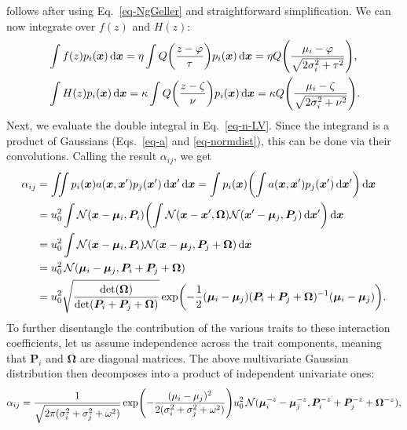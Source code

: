 \documentclass{article}
\newcommand{\mat}[1]{\bm{#1}}
\newcommand{\ud}{\text{d}}
\let\originalleft\left
\let\originalright\right
\renewcommand{\left}{\mathopen{}\mathclose\bgroup\originalleft}
\renewcommand{\right}{\aftergroup\egroup\originalright}
\begin{document}
follows after using Eq.~\ref{eq-NgGeller} and straightforward simplification. We can now integrate over $f(z)$ and $H(z)$:
\begin{align}
  \label{eq-fN}
  &\int f(z) p_i(\mat{x}) \,\ud\mat{x}
  = \eta \int Q\left( \frac{z-\varphi}{\tau} \right)
  p_i(\mat{x}) \,\ud\mat{x}
  = \eta Q\left(\frac{\mu_i-\varphi}
  {\sqrt{2\sigma_i^2+\tau^2}}\right), \\
  \label{eq-HN}
  &\int H(z) p_i(\mat{x}) \,\ud\mat{x}
  = \kappa \int Q\left( \frac{z-\zeta}{\nu} \right)
  p_i(\mat{x}) \,\ud\mat{x}
  = \kappa Q \left(\frac{\mu_i-\zeta}
  {\sqrt{2\sigma_i^2+\nu^2}}\right) .
\end{align}
Next, we evaluate the double integral in Eq.~\ref{eq-n-LV}. Since the integrand is a product of Gaussians (Eqs.~\ref{eq-a} and \ref{eq-normdist}), this can be done via their convolutions. Calling the result $\alpha_{ij}$, we get
\begin{equation}
  \label{eq-alphaN-calc}
  \begin{split}
    \alpha_{ij}
    &= \iint p_i(\mat{x}) a(\mat{x},\mat{x}')
    p_j(\mat{x}') \,\ud \mat{x}' \,\ud \mat{x}
    = \int p_i(\mat{x}) \left( \int a(\mat{x}, \mat{x}')
    p_j(\mat{x}') \,\ud \mat{x}' \right) \,\ud \mat{x}
    \\ &= u_0^2 \int \mathcal{N}(\mat{x} - \mat{\mu}_i, \mat{P}_i)
    \left( \int \mathcal{N}(\mat{x} - \mat{x}', \mat{\Omega})
    \mathcal{N}(\mat{x}' - \mat{\mu}_j, \mat{P}_j)
    \,\ud \mat{x}' \right) \,\ud \mat{x}
    \\ &= u_0^2 \int \mathcal{N}(\mat{x} - \mat{\mu}_i, \mat{P}_i)
    \mathcal{N}(\mat{x} - \mat{\mu}_j, \mat{P}_j + \mat{\Omega})
    \,\ud \mat{x}
    \\ &= u_0^2 \, \mathcal{N}(\mat{\mu}_i - \mat{\mu}_j,
    \mat{P}_i + \mat{P}_j + \mat{\Omega})
    \\ &= u_0^2 \sqrt{\frac{\det(\mat{\Omega})}
    {\det(\mat{P}_i+\mat{P}_j+\mat{\Omega})}}
    \exp \left( -\frac{1}{2} (\mat{\mu}_i - \mat{\mu}_j)
    (\mat{P}_i + \mat{P}_j +\mat{\Omega})^{-1}
    (\mat{\mu}_i - \mat{\mu}_j) \right) .
  \end{split}
\end{equation}
To further disentangle the contribution of the various traits to these interaction coefficients, let us assume independence across the trait components, meaning that $\mat{P}_i$ and $\mat{\Omega}$ are diagonal matrices. The above multivariate Gaussian distribution then decomposes into a product of independent univariate ones:
\begin{equation}
  \label{eq-a-decomp}
  \alpha_{ij}
  = \frac{1}{\sqrt{2\pi(\sigma_i^2 + \sigma_j^2 + \omega^2)}}
  \exp \left( -\frac{(\mu_i - \mu_j)^2}
  {2(\sigma_i^2 + \sigma_j^2 + \omega^2)} \right)
  u_0^2\, \mathcal{N}(\mat{\mu}_i^{-z} - \mat{\mu}_j^{-z},
  \mat{P}_i^{-z} + \mat{P}_j^{-z} + \mat{\Omega}^{-z}) ,
\end{equation}
\end{document}
